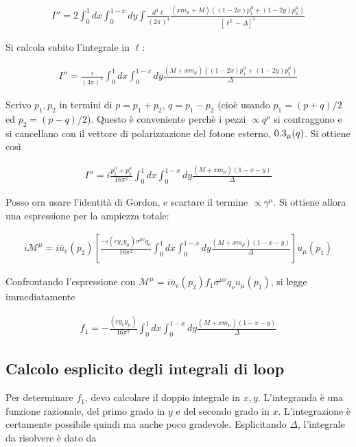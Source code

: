 \documentclass[11pt]{report}
\begin{document}
\begin{align}
    I'' = 2\int_0^1 dx \int_0^{1-x}dy \int \frac{d^4\ell}{(2\pi)^4}\frac{(xm_\mu +M)((1-2x)p_1^\mu + (1-2y)p_2^\mu)}{[\ell^2 -\Delta]^3}
\end{align}

Si calcola subito l'integrale in \(\ell\): 

\begin{align}
    I'' = \frac{i}{(4\pi)^2}\int_0^1 dx \int_0^{1-x}dy \frac{(M+xm_\mu)((1-2x)p_1^\mu + (1-2y)p_2^\mu)}{\Delta}
\end{align}

Scrivo \(p_1, p_2\) in termini di \(p = p_1+p_2\), \(q = p_1-p_2\) (cioè usando \(p_1 = (p+q)/2\) ed \(p_2 = (p-q)/2\)). Questo è conveniente perchè i pezzi \(\propto q^\mu\) si contraggono e si cancellano con il vettore di polarizzazione del fotone esterno, \(0.3_\mu(q)\). Si ottiene così 

\begin{align}
    I'' = i\frac{p_1^\mu + p_2^\mu}{16\pi^2}\int_0^1 dx \int_0^{1-x}dy \frac{(M+xm_\mu)(1-x-y)}{\Delta}
\end{align}

Posso ora usare l'identità di Gordon, e scartare il termine \(\propto \gamma^\mu\). Si ottiene allora una espressione per la ampiezza totale: 

\begin{align}
    i\mathcal{M}^\mu = i \bar{u}_e(p_2)\left[\frac{-i(ey_ey_\mu)\sigma^{\mu\nu}q_\nu}{16\pi^2}\int_0^1 dx \int_0^{1-x}dy \frac{(M+xm_\mu)(1-x-y)}{\Delta}\right]u_\mu (p_1)
\end{align}

Confrontando l'espressione con \(\mathcal{M}^\mu = i\bar{u}_e(p_2)f_1\sigma^{\mu\nu}q_\nu u_\mu(p_1)\), si legge immediatamente 

\begin{align}
    f_1 = -\frac{(ey_e y_\mu)}{16\pi^2}\int_0^1 dx \int_0^{1-x}dy \frac{(M+xm_\mu)(1-x-y)}{\Delta}
\end{align}

\subsection{Calcolo esplicito degli integrali di loop}

Per determinare \(f_1\), devo calcolare il doppio integrale in \(x, y\). L'integranda è una funzione razionale, del primo grado in \(y\) e del secondo grado in \(x\). L'integrazione è certamente possibile quindi ma anche poco gradevole. Esplicitando \(\Delta\), l'integrale da risolvere è dato da 
\end{document}
